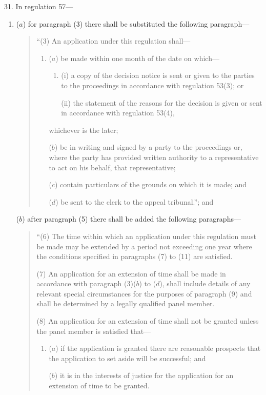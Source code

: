 \documentclass[12pt,a4paper]{article}
\begin{document}
31.  In regulation 57—
\begin{enumerate}\item[]
($a$) for paragraph (3) there shall be substituted the following paragraph—
\begin{quotation}
“(3) An application under this regulation shall—
\begin{enumerate}\item[]
($a$) be made within one month of the date on which—
\begin{enumerate}\item[]
(i) a copy of the decision notice is sent or given to the parties to the proceedings in accordance with regulation 53(3); or

(ii) the statement of the reasons for the decision is given or sent in accordance with regulation 53(4),
\end{enumerate}
whichever is the later;

($b$) be in writing and signed by a party to the proceedings or, where the party has provided written authority to a representative to act on his behalf, that representative;

($c$) contain particulars of the grounds on which it is made; and

($d$) be sent to the clerk to the appeal tribunal.”; and
\end{enumerate}
\end{quotation}

($b$) after paragraph (5) there shall be added the following paragraphs—
\begin{quotation}
“(6) The time within which an application under this regulation must be made may be extended by a period not exceeding one year where the conditions specified in paragraphs (7) to (11) are satisfied.

(7) An application for an extension of time shall be made in accordance with paragraph (3)($b$)  to ($d$), shall include details of any relevant special circumstances for the purposes of paragraph (9) and shall be determined by a legally qualified panel member.

(8) An application for an extension of time shall not be granted unless the panel member is satisfied that—
\begin{enumerate}\item[]
($a$) if the application is granted there are reasonable prospects that the application to set aside will be successful; and

($b$) it is in the interests of justice for the application for an extension of time to be granted.
\end{enumerate}


\end{quotation}
\end{enumerate}
\end{document}
